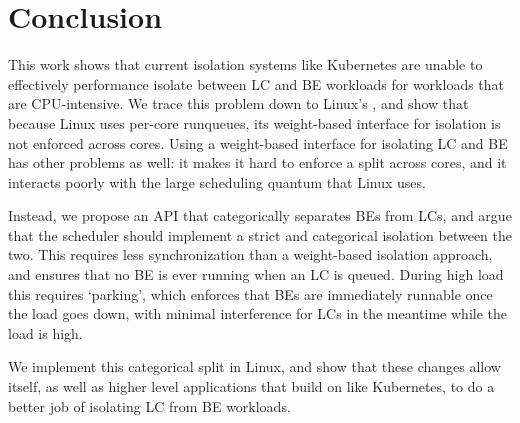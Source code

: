 \section{Conclusion}

This work shows that current isolation systems like Kubernetes are unable to
effectively performance isolate between LC and BE workloads for workloads that
are CPU-intensive. We trace this problem down to Linux's \cgroups{}, and show
that because Linux uses per-core runqueues, its weight-based interface for
isolation is not enforced across cores. Using a weight-based interface for
isolating LC and BE has other problems as well: it makes it hard to enforce a
split across cores, and it interacts poorly with the large scheduling quantum
that Linux uses.

Instead, we propose an API that categorically separates BEs from LCs, and argue
that the scheduler should implement a strict and categorical isolation between
the two. This requires less synchronization than a weight-based isolation
approach, and ensures that no BE is ever running when an LC is queued. During
high load this requires `parking', which enforces that BEs are immediately
runnable once the load goes down, with minimal interference for LCs in the
meantime while the load is high.

We implement this categorical split in Linux, and show that these changes allow
\cgroups{} itself, as well as higher level applications that build on \cgroups{}
like Kubernetes, to do a better job of isolating LC from BE workloads.


